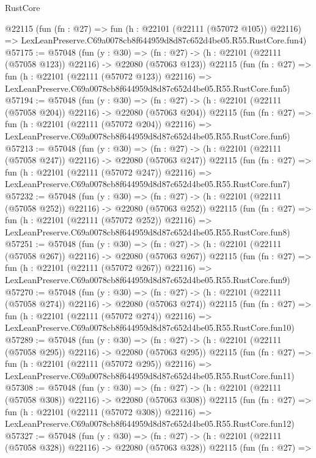 \begin{lexlean}{RustCore}
\begin{coremodule}
    @22115
    (fun (fn : @27) =>
    fun (h : @22101 (@22111 (@57072 @105)) @22116) =>
    LexLeanPreserve.C69a0078cb8f644959d8d87c652d4be05.R55.RustCore.fun4)
@57175 := @57048
    (fun (y : @30) =>
    (fn : @27) -> (h : @22101 (@22111 (@57058 @123)) @22116) -> @22080 (@57063 @123))
    @22115
    (fun (fn : @27) =>
    fun (h : @22101 (@22111 (@57072 @123)) @22116) =>
    LexLeanPreserve.C69a0078cb8f644959d8d87c652d4be05.R55.RustCore.fun5)
@57194 := @57048
    (fun (y : @30) =>
    (fn : @27) -> (h : @22101 (@22111 (@57058 @204)) @22116) -> @22080 (@57063 @204))
    @22115
    (fun (fn : @27) =>
    fun (h : @22101 (@22111 (@57072 @204)) @22116) =>
    LexLeanPreserve.C69a0078cb8f644959d8d87c652d4be05.R55.RustCore.fun6)
@57213 := @57048
    (fun (y : @30) =>
    (fn : @27) -> (h : @22101 (@22111 (@57058 @247)) @22116) -> @22080 (@57063 @247))
    @22115
    (fun (fn : @27) =>
    fun (h : @22101 (@22111 (@57072 @247)) @22116) =>
    LexLeanPreserve.C69a0078cb8f644959d8d87c652d4be05.R55.RustCore.fun7)
@57232 := @57048
    (fun (y : @30) =>
    (fn : @27) -> (h : @22101 (@22111 (@57058 @252)) @22116) -> @22080 (@57063 @252))
    @22115
    (fun (fn : @27) =>
    fun (h : @22101 (@22111 (@57072 @252)) @22116) =>
    LexLeanPreserve.C69a0078cb8f644959d8d87c652d4be05.R55.RustCore.fun8)
@57251 := @57048
    (fun (y : @30) =>
    (fn : @27) -> (h : @22101 (@22111 (@57058 @267)) @22116) -> @22080 (@57063 @267))
    @22115
    (fun (fn : @27) =>
    fun (h : @22101 (@22111 (@57072 @267)) @22116) =>
    LexLeanPreserve.C69a0078cb8f644959d8d87c652d4be05.R55.RustCore.fun9)
@57270 := @57048
    (fun (y : @30) =>
    (fn : @27) -> (h : @22101 (@22111 (@57058 @274)) @22116) -> @22080 (@57063 @274))
    @22115
    (fun (fn : @27) =>
    fun (h : @22101 (@22111 (@57072 @274)) @22116) =>
    LexLeanPreserve.C69a0078cb8f644959d8d87c652d4be05.R55.RustCore.fun10)
@57289 := @57048
    (fun (y : @30) =>
    (fn : @27) -> (h : @22101 (@22111 (@57058 @295)) @22116) -> @22080 (@57063 @295))
    @22115
    (fun (fn : @27) =>
    fun (h : @22101 (@22111 (@57072 @295)) @22116) =>
    LexLeanPreserve.C69a0078cb8f644959d8d87c652d4be05.R55.RustCore.fun11)
@57308 := @57048
    (fun (y : @30) =>
    (fn : @27) -> (h : @22101 (@22111 (@57058 @308)) @22116) -> @22080 (@57063 @308))
    @22115
    (fun (fn : @27) =>
    fun (h : @22101 (@22111 (@57072 @308)) @22116) =>
    LexLeanPreserve.C69a0078cb8f644959d8d87c652d4be05.R55.RustCore.fun12)
@57327 := @57048
    (fun (y : @30) =>
    (fn : @27) -> (h : @22101 (@22111 (@57058 @328)) @22116) -> @22080 (@57063 @328))
    @22115
    (fun (fn : @27) =>

\end{coremodule}
\end{lexlean}
